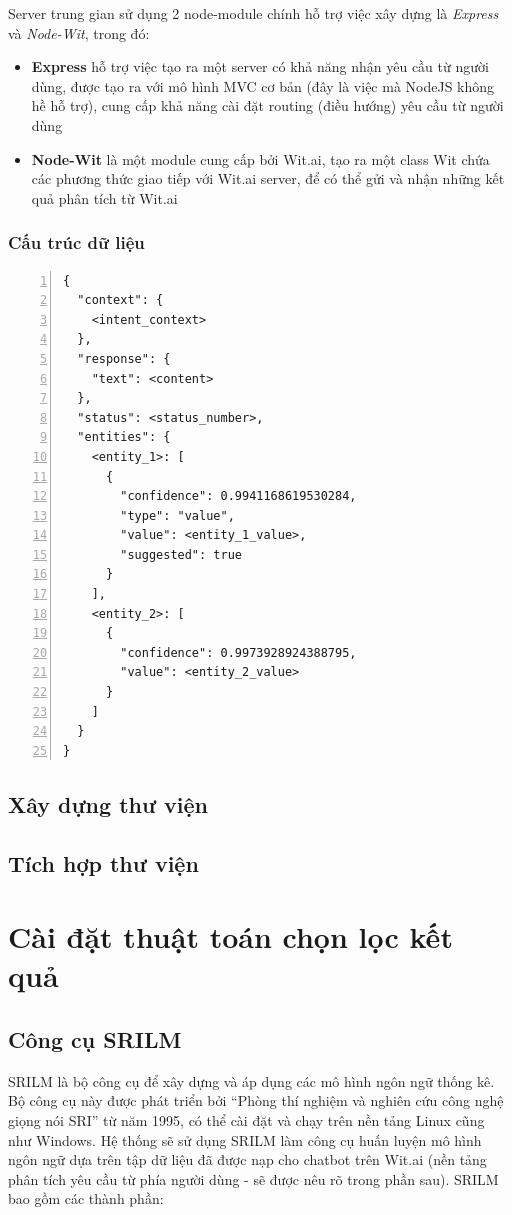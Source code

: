 \documentclass[12pt]{report}
\begin{document}
Server trung gian sử dụng 2 node-module chính hỗ trợ việc xây dựng là \textit{Express} và \textit{Node-Wit}, trong đó:

\begin{itemize}
	\item \textbf{Express} hỗ trợ việc tạo ra một server có khả năng nhận yêu cầu từ người dùng, được tạo ra với mô hình MVC cơ bản (đây là việc mà NodeJS không hề hỗ trợ), cung cấp khả năng cài đặt routing (điều hướng) yêu cầu từ người dùng
	\item \textbf{Node-Wit} là một module cung cấp bởi Wit.ai, tạo ra một class Wit chứa các phương thức giao tiếp với Wit.ai server, để có thể gửi và nhận những kết quả phân tích từ Wit.ai
\end{itemize}

\subsubsection{Cấu trúc dữ liệu}

\begin{lstlisting}[frame=lines, basicstyle=\footnotesize\ttfamily, numbers=left, numberstyle=\tiny\color{black},caption= {Cấu trúc một API trả về}, backgroundcolor=\color{background}]
{
  "context": {
    <intent_context>
  },
  "response": {
    "text": <content>
  },
  "status": <status_number>,
  "entities": {
    <entity_1>: [
      {
        "confidence": 0.9941168619530284,
        "type": "value",
        "value": <entity_1_value>,
        "suggested": true
      }
    ],
    <entity_2>: [
      {
        "confidence": 0.9973928924388795,
        "value": <entity_2_value>
      }
    ]
  }
}
\end{lstlisting}

\subsection{Xây dựng thư viện}

\subsection{Tích hợp thư viện}

\section{Cài đặt thuật toán chọn lọc kết quả}

\subsection{Công cụ SRILM}
SRILM là bộ công cụ để xây dựng và áp dụng các mô hình ngôn ngữ thống kê. Bộ công cụ này được phát triển bởi “Phòng thí nghiệm và nghiên cứu công nghệ giọng nói SRI” từ năm 1995, có thể cài đặt và chạy trên nền tảng Linux cũng như Windows.
Hệ thống sẽ sử dụng SRILM làm công cụ huấn luyện mô hình ngôn ngữ dựa trên tập dữ liệu đã được nạp cho chatbot trên Wit.ai (nền tảng phân tích yêu cầu từ phía người dùng - sẽ được nêu rõ trong phần sau). SRILM bao gồm các thành phần:
\end{document}
